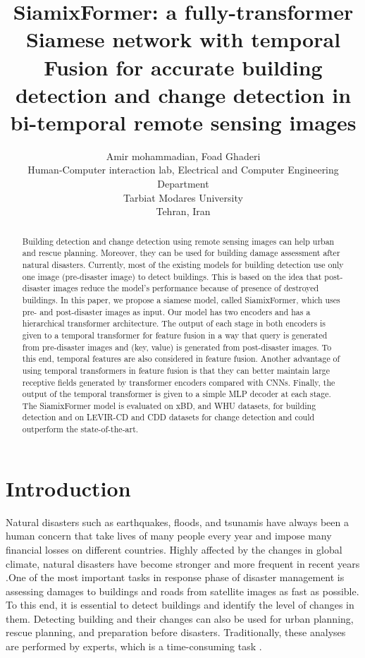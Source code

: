 \documentclass{article}
\title{SiamixFormer: a fully-transformer Siamese network with temporal Fusion for accurate building detection and change detection in bi-temporal remote sensing images}
\author{
 Amir mohammadian, Foad Ghaderi \\
  Human-Computer interaction lab, Electrical and Computer Engineering Department\\
  Tarbiat Modares University \\
  Tehran, Iran \\
}
\begin{document}
\maketitle
\begin{abstract}
Building detection and change detection using remote sensing images can help urban and rescue planning. Moreover, they can be used for building damage assessment after natural disasters. Currently, most of the existing models for building detection use only one image (pre-disaster image) to detect buildings. This is based on the idea that post-disaster images reduce the model's performance because of presence of destroyed buildings. In this paper, we propose a siamese model, called SiamixFormer, which uses pre- and post-disaster images as input. Our model has two encoders and has a hierarchical transformer architecture. The output of each stage in both encoders is given to a temporal transformer for feature fusion in a way that query is generated from pre-disaster images and (key, value) is generated from post-disaster images. To this end, temporal features are also considered in feature fusion. Another advantage of using temporal transformers in feature fusion is that they can better maintain large receptive fields generated by transformer encoders compared with CNNs. Finally, the output of the temporal transformer is given to a simple MLP decoder at each stage. The SiamixFormer model is evaluated on xBD, and WHU datasets, for building detection and on LEVIR-CD and CDD datasets for change detection and could outperform the state-of-the-art.
\end{abstract}





\section{Introduction}
\label{sec1}
Natural disasters such as earthquakes, floods, and tsunamis have always been a human concern that take lives of many people every year and impose many financial losses on different countries. Highly affected by the changes in global climate, natural disasters have become stronger and more frequent in recent years \cite{rolnick2022tackling}.One of the most important tasks in response phase of disaster management is assessing damages to buildings and roads from satellite images as fast as possible. To this end, it is essential to detect buildings and identify the level of changes in them. Detecting building and their changes can also be used for urban planning, rescue planning, and preparation before disasters. Traditionally, these analyses are performed by experts, which is a time-consuming task \cite{shen2021bdanet}.
\end{document}
